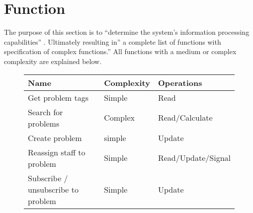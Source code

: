 \section{Function}
\label{sec:function}

The purpose of this section is to ``determine the system's information processing capabilities'' \cite[p.~137]{roedeaalborg}. Ultimately resulting in'' a complete list of functions with specification of complex functions.'' \cite[p.~137]{roedeaalborg} 
All functions with a medium or complex complexity are explained below.



\begin{figure}[hpt] %
\begin{center}
\begin{tabular}{|l|l|l|}
\hline
\textbf{Name}								&\textbf{Complexity} & \textbf{Operations}   \\ \hline%
Get problem tags						&   Simple & Read   \\ \hline%
Search for problems 				&  Complex & Read/Calculate   \\ \hline%
Create problem 							&   simple & Update   \\ \hline%
Reassign staff to problem 	&   Simple & Read/Update/Signal   \\ \hline%
Subscribe / unsubscribe  to problem 	&   Simple & Update   \\ \hline%

\end{tabular}
\end{center}
\end{figure}
